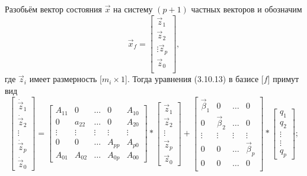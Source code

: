 Разобьём вектор состояния $\vec{x}$ на систему $(p+1)$ частных векторов и обозначим
\begin{equation}
	\vec{x}_f=\begin{bmatrix}
	\vec{z}_1\\\vec{z}_2\\\vdots\vec{z}_p\\\vec{z}_0\\
	\end{bmatrix},
\end{equation}
где $\vec{z}_i$ имеет размерность [$m_i\times1$]. Тогда уравнения (3.10.13) в базисе [$f$] примут вид
\begin{equation*}
	\begin{bmatrix}
	\dot{\vec{z}}_1 \\ \dot{\vec{z}}_2 \\ \vdots \\ \dot{\vec{z}}_p \\ \dot{\vec{z}}_0
	\end{bmatrix}=
	\begin{bmatrix}
	A_{11} & 0 & \dots & 0 & A_{10}\\
	0 & a_{22} & \dots & 0 & A_{20}\\
	\vdots & \vdots & \vdots & \vdots & \vdots\\
	0 & 0 & \dots & A_{pp} & A_{p0}\\
	A_{01} & A_{02} & \dots & A_{0p} & A_{00}
	\end{bmatrix} * 
	\begin{bmatrix}
	\vec{z}_1 \\ \vec{z}_2 \\ \vdots \\ \vec{z}_p \\ \vec{z}_0   
	\end{bmatrix}+
	\begin{bmatrix}
	\vec{\beta}_1 & 0 & \dots & 0\\
	0 & \vec{\beta}_2 & \dots & 0\\
	\vdots & \vdots & \vdots & \vdots\\
	0 & 0 & \dots & \vec{\beta}_p\\
	0 & 0 & \dots & 0\\
	\end{bmatrix} * 
	\begin{bmatrix}
	q_1 \\ q_2 \\ \vdots \\ \vdots \\ q_p
	\end{bmatrix};
\end{equation*}
